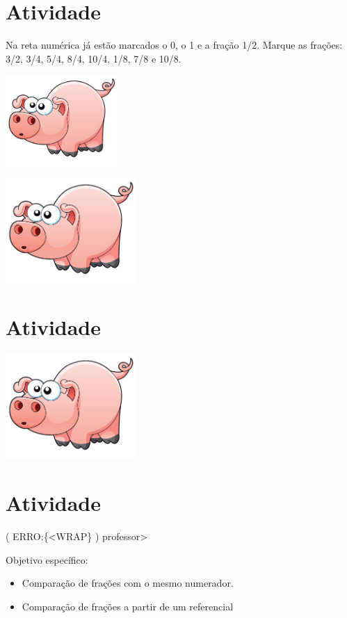 \documentclass[a4,12pt]{book}
\begin{document}
\section{Atividade}



Na reta numérica já estão marcados o 0, o 1 e a fração 1/2. Marque as frações: 3/2, 3/4, 5/4, 8/4, 10/4, 1/8, 7/8 e 10/8.

\includegraphics[width=120pt, keepaspectratio]{pig}




\includegraphics[width=\textwidth,height=4cm, keepaspectratio]{pig}
\section{Atividade}







\includegraphics[width=\textwidth,height=4cm, keepaspectratio]{pig}
\section{Atividade}




( ERRO:\{<WRAP\} ) professor>

Objetivo específico:
\begin{itemize} %
  \item     Comparação de frações com o mesmo numerador.
  \item     Comparação de frações a partir de um referencial
\end{itemize} %
\end{document}
